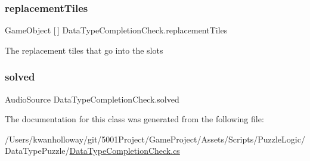 \subsubsection{\texorpdfstring{replacement\+Tiles}{replacementTiles}}
{\footnotesize\ttfamily Game\+Object \mbox{[}$\,$\mbox{]} Data\+Type\+Completion\+Check.\+replacement\+Tiles}



The replacement tiles that go into the slots 

\mbox{\label{class_data_type_completion_check_ab5a51018023ce893836ccfabf1c73f60}} 
\subsubsection{\texorpdfstring{solved}{solved}}
{\footnotesize\ttfamily Audio\+Source Data\+Type\+Completion\+Check.\+solved}



The documentation for this class was generated from the following file\+:\begin{DoxyCompactItemize}
\item 
/\+Users/kwanholloway/git/5001\+Project/\+Game\+Project/\+Assets/\+Scripts/\+Puzzle\+Logic/\+Data\+Type\+Puzzle/\hyperlink{_data_type_completion_check_8cs}{Data\+Type\+Completion\+Check.\+cs}\end{DoxyCompactItemize}
